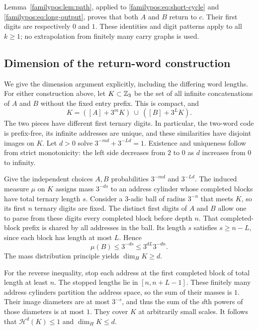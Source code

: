 Lemma~\ref{familypos:lem:path}, applied to
\eqref{familypos:eq:short-cycle} and
\eqref{familypos:eq:long-output}, proves that both $A$ and $B$
return to $c$. Their first digits are respectively $0$ and $1$.
These identities and digit patterns apply to all $k\ge1$; no
extrapolation from finitely many carry graphs is used.

\subsection{Dimension of the return-word construction}

We give the dimension argument explicitly, including the differing
word lengths. For either construction above, let $K\subset\mathbb Z_3$
be the set of all infinite concatenations of $A$ and $B$ without
the fixed entry prefix. This is compact, and
\[
        K=([A]+3^mK)\ \cup\ ([B]+3^LK).
\]
The two pieces have different first ternary digits. In particular,
the two-word code is prefix-free, its infinite addresses are
unique, and these similarities have disjoint images on $K$.
Let $d>0$ solve $3^{-md}+3^{-Ld}=1$. Existence and uniqueness
follow from strict monotonicity: the left side decreases from
$2$ to $0$ as $d$ increases from $0$ to infinity.

Give the independent choices $A,B$ probabilities $3^{-md}$ and
$3^{-Ld}$. The induced measure $\mu$ on $K$ assigns mass
$3^{-ds}$ to an address cylinder whose completed blocks have
total ternary length $s$. Consider a $3$-adic ball of radius
$3^{-n}$ that meets $K$, so its first $n$ ternary digits are
fixed. The distinct first digits of $A$ and $B$ allow one to
parse from these digits every completed block before depth $n$.
That completed-block prefix is shared by all addresses in the
ball. Its length $s$ satisfies $s\ge n-L$, since each block
has length at most $L$. Hence
\begin{equation}\label{familypos:eq:mass}
                \mu(B)\le3^{-ds}\le3^{dL}3^{-dn}.
\end{equation}
The mass distribution principle yields $\dim_H K\ge d$.

For the reverse inequality, stop each address at the first
completed block of total length at least $n$. The stopped
lengths lie in $[n,n+L-1]$. These finitely many address cylinders
partition the address space, so the sum of their masses is $1$.
Their image diameters are at most $3^{-s}$, and thus the sum
of the $d$th powers of those diameters is at most $1$.
They cover $K$ at arbitrarily small scales. It follows that
$\mathcal H^d(K)\le1$ and $\dim_H K\le d$.

